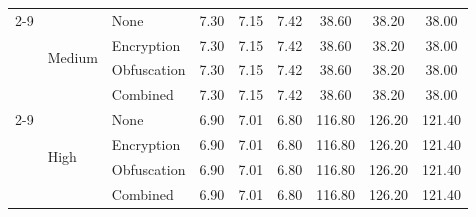\begin{table}[!t]
\begin{tabular}{lllccc ccc}
\cmidrule(lr){2-9}
 & \multirow{4}{*}{Medium} & None & 7.30 & \cellcolor[gray]{0.70}7.15 & 7.42 & \cellcolor[gray]{0.70}38.60 & 38.20 & 38.00 \\
 &  & Encryption & 7.30 & \cellcolor[gray]{0.70}7.15 & 7.42 & \cellcolor[gray]{0.70}38.60 & 38.20 & 38.00 \\
 &  & Obfuscation & 7.30 & \cellcolor[gray]{0.70}7.15 & 7.42 & \cellcolor[gray]{0.70}38.60 & 38.20 & 38.00 \\
 &  & Combined & 7.30 & \cellcolor[gray]{0.70}7.15 & 7.42 & \cellcolor[gray]{0.70}38.60 & 38.20 & 38.00 \\
\cmidrule(lr){2-9}
 & \multirow{4}{*}{High} & None & 6.90 & 7.01 & \cellcolor[gray]{0.70}6.80 & 116.80 & \cellcolor[gray]{0.70}126.20 & 121.40 \\
 &  & Encryption & 6.90 & 7.01 & \cellcolor[gray]{0.70}6.80 & 116.80 & \cellcolor[gray]{0.70}126.20 & 121.40 \\
 &  & Obfuscation & 6.90 & 7.01 & \cellcolor[gray]{0.70}6.80 & 116.80 & \cellcolor[gray]{0.70}126.20 & 121.40 \\
 &  & Combined & 6.90 & 7.01 & \cellcolor[gray]{0.70}6.80 & 116.80 & \cellcolor[gray]{0.70}126.20 & 121.40 \\
\bottomrule
\end{tabular}
\end{table}
